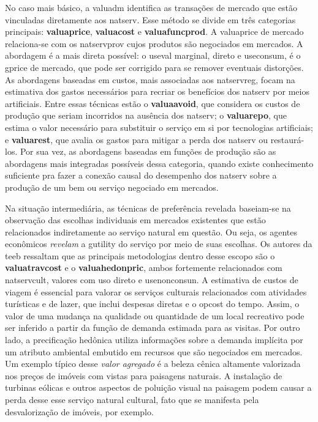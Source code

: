\documentclass[./main.tex]{subfiles}
\begin{document}
\par No caso mais básico, a \gls{valuadm} identifica as transações de mercado que estão vinculadas diretamente aos \gls{natserv}. Esse método se divide em três categorias principais: \textbf{\gls{valuaprice}}, \textbf{\gls{valuacost}} e \textbf{\gls{valuafuncprod}}. A \gls{valuaprice} de mercado relaciona-se com os \gls{natservprov} cujos produtos são negociados em mercados. A abordagem é a mais direta possível: o \gls{useval} marginal, direto e \gls{useconsum}, é o \gls{gprice} de mercado, que pode ser corrigido para se remover eventuais distorções. As abordagens baseadas em custos, mais associadas aos \gls{natservreg}, focam na estimativa dos gastos necessários para recriar os benefícios dos \gls{natserv} por meios artificiais. Entre essas técnicas estão o \textbf{\gls{valuaavoid}}, que considera os custos de produção que seriam incorridos na ausência dos \gls{natserv}; o \textbf{\gls{valuarepo}}, que estima o valor necessário para substituir o serviço em si por tecnologias artificiais; e \textbf{\gls{valuarest}}, que avalia os gastos para mitigar a perda dos \gls{natserv} ou restaurá-los. Por sua vez, as abordagens baseadas em funções de produção são as abordagens mais integradas possíveis dessa categoria, quando existe conhecimento suficiente pra fazer a conexão causal do desempenho dos \gls{natserv} sobre a produção de um bem ou serviço negociado em mercados. 

\par Na situação intermediária, as técnicas de preferência revelada baseiam-se na observação das escolhas individuais em mercados existentes que estão relacionados indiretamente ao serviço natural em questão. Ou seja, os agentes econômicos \textit{revelam} a \gls{gutility} do serviço por meio de suas escolhas. Os autores da \acrshort{teeb} ressaltam que as principais metodologias dentro desse escopo são o \textbf{\gls{valuatravcost}} e o \textbf{\gls{valuahedonpric}}, ambos fortemente relacionados com \gls{natservcult}, valores com uso direto e \gls{usenonconsun}. A estimativa de custos de viagem é essencial para valorar os serviços culturais relacionados com atividades turísticas e de lazer, que inclui despesas diretas e o \gls{opcost} do tempo. Assim, o valor de uma mudança na qualidade ou quantidade de um local recreativo pode ser inferido a partir da função de demanda estimada para as visitas. Por outro lado, a precificação hedônica utiliza informações sobre a demanda implícita por um atributo ambiental embutido em recursos que são negociados em mercados. Um exemplo típico desse \textit{valor agregado} é a beleza cênica altamente valorizada nos preços de imóveis com vistas para paisagens naturais. A instalação de turbinas eólicas e outros aspectos de poluição visual na paisagem podem causar a perda desse esse serviço natural cultural, fato que se manifesta pela desvalorização de imóveis, por exemplo.
\end{document}
